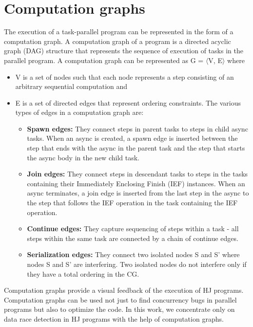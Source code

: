 \section{Computation graphs}
The execution of a task-parallel program can be represented in the form of a computation graph. A computation graph of a program is a directed acyclic graph (DAG) structure that represents the sequence of execution of tasks in the parallel program. A computation graph can be represented as G = $\langle$V, E$\rangle$ where
\begin{itemize}
\item V is a set of nodes such that  each node represents a step consisting of an arbitrary sequential computation and
\item E is a set of directed edges that represent ordering constraints. The various types of edges in a computation graph are:
\begin{itemize}
 \item \textbf{Spawn edges:} They connect steps in parent tasks to steps in child async tasks. When an async is created, a spawn edge is inserted between the step that ends with the async in the parent task and the step that starts the async body in the new child task.
\item \textbf{Join edges:} They connect steps in descendant tasks to steps in the tasks containing their Immediately Enclosing Finish (IEF) instances. When an async terminates, a join edge is inserted from the last step in the async to the step that follows the IEF operation in the task containing the IEF operation.
\item \textbf{Continue edges:} They capture sequencing of steps within a task - all steps within the same task are connected by a chain of continue edges.
\item \textbf{Serialization edges:} They connect two isolated nodes S and S' where nodes S and S' are interfering. Two isolated nodes do not interfere only if they have a total ordering in the CG.
\end{itemize}
\end{itemize}

Computation graphs provide a visual feedback of the execution of HJ programs. Computation graphs can be used not just to find concurrency bugs in parallel  programs but also to optimize the code. In this work, we concentrate only on data race detection in HJ programs with the help of computation graphs.

